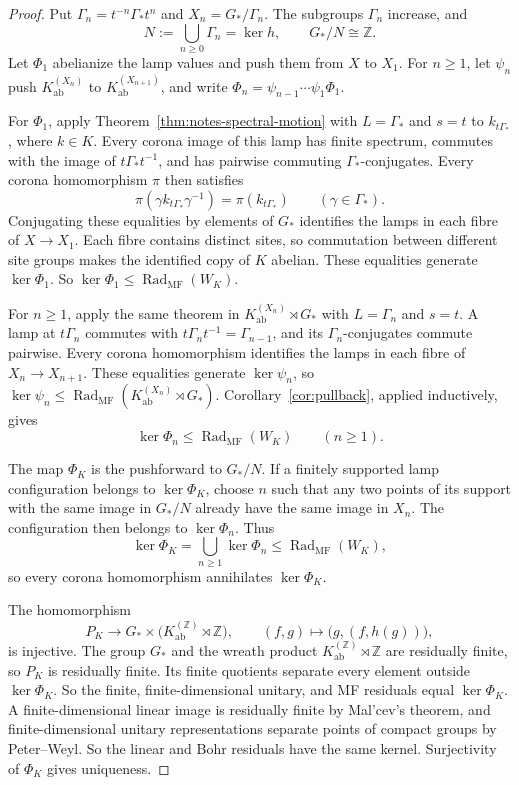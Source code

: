\documentclass[11pt]{amsart}
\theoremstyle{definition}
\theoremstyle{remark}
\theoremstyle{plain}
\begin{document}
\begin{proof}
Put $\Gamma_n=t^{-n}\Gamma_*t^n$ and $X_n=G_*/\Gamma_n$.  The subgroups
$\Gamma_n$ increase, and
\[
 N:=\bigcup_{n\geq0}\Gamma_n=\ker h,
 \qquad G_*/N\cong\mathbb Z.
\]
Let $\Phi_1$ abelianize the lamp values and push them from $X$ to $X_1$.
For $n\geq1$, let $\psi_n$ push
$K_{\mathrm{ab}}^{(X_n)}$ to $K_{\mathrm{ab}}^{(X_{n+1})}$, and write
$\Phi_n=\psi_{n-1}\cdots\psi_1\Phi_1$.

For $\Phi_1$, apply Theorem~\ref{thm:notes-spectral-motion} with
$L=\Gamma_*$ and $s=t$ to $k_{t\Gamma_*}$, where $k\in K$.  Every corona
image of this lamp has finite spectrum, commutes with the image of
$t\Gamma_*t^{-1}$, and has pairwise commuting $\Gamma_*$-conjugates.  Every corona
homomorphism $\pi$ then satisfies
\[
 \pi(\gamma k_{t\Gamma_*}\gamma^{-1})=\pi(k_{t\Gamma_*})
 \qquad(\gamma\in\Gamma_*).
\]
Conjugating these equalities by elements of $G_*$ identifies the lamps in
each fibre of $X\to X_1$.  Each fibre
contains distinct sites, so commutation between different site groups makes
the identified copy of $K$ abelian.  These equalities generate
$\ker\Phi_1$.  So
$\ker\Phi_1\leq\operatorname{Rad}_{\mathrm{MF}}(W_K)$.

For $n\geq1$, apply the same theorem in
$K_{\mathrm{ab}}^{(X_n)}\rtimes G_*$ with $L=\Gamma_n$ and $s=t$.  A lamp at
$t\Gamma_n$ commutes with $t\Gamma_nt^{-1}=\Gamma_{n-1}$, and its
$\Gamma_n$-conjugates commute pairwise.  Every corona homomorphism identifies
the lamps in each fibre of $X_n\to X_{n+1}$.  These equalities generate
$\ker\psi_n$, so
$\ker\psi_n\leq\operatorname{Rad}_{\mathrm{MF}}
(K_{\mathrm{ab}}^{(X_n)}\rtimes G_*)$.  Corollary~\ref{cor:pullback}, applied
inductively, gives
\[
 \ker\Phi_n\leq\operatorname{Rad}_{\mathrm{MF}}(W_K)
 \qquad(n\geq1).
\]

The map $\Phi_K$ is the pushforward to $G_*/N$.  If a finitely supported lamp
configuration belongs to $\ker\Phi_K$, choose $n$ such that any two points of
its support with the same image in $G_*/N$ already have the same image in
$X_n$.  The configuration then belongs to $\ker\Phi_n$.  Thus
\[
\ker\Phi_K=\bigcup_{n\geq1}\ker\Phi_n
 \leq\operatorname{Rad}_{\mathrm{MF}}(W_K),
\]
so every corona homomorphism annihilates $\ker\Phi_K$.

The homomorphism
\[
 P_K\longrightarrow G_*\times
 \bigl(K_{\mathrm{ab}}^{(\mathbb Z)}\rtimes\mathbb Z\bigr),
 \qquad (f,g)\longmapsto\bigl(g,(f,h(g))\bigr),
\]
is injective.  The group $G_*$ and the wreath product
$K_{\mathrm{ab}}^{(\mathbb Z)}\rtimes\mathbb Z$
are residually finite, so $P_K$ is residually finite.  Its finite quotients
separate every element outside $\ker\Phi_K$.  So the finite,
finite-dimensional unitary, and MF residuals equal
$\ker\Phi_K$.  A
finite-dimensional linear image is residually finite by Mal'cev's theorem,
and finite-dimensional unitary representations separate points of compact
groups by Peter--Weyl.  So the linear and Bohr residuals have the same
kernel.  Surjectivity of $\Phi_K$ gives uniqueness.
\end{proof}
\end{document}

